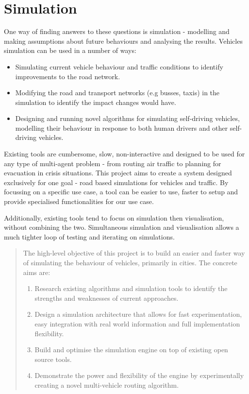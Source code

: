 \documentclass[ draft,
                    author={Alexander Hill},
                supervisor={Dr. Benjamin Sach},
                    degree={MEng},
                     title={MARMOSET: Multi Agent Real-time Multi-core Online
                     Simulation for Efficient Transportation},
                  subtitle={},
                      type={research},
                      year={2016} ]{dissertation}
\begin{document}
\section{Simulation}

One way of finding answers to these questions is simulation - modelling and
making assumptions about future behaviours and analysing the results. Vehicles
simulation can be used in a number of ways:

\begin{itemize}
    \item Simulating current vehicle behaviour and traffic conditions to
        identify improvements to the road network.
    \item Modifying the road and transport networks (e.g busses, taxis) in the
        simulation to identify the impact changes would have.
    \item Designing and running novel algorithms for simulating self-driving
        vehicles, modelling their behaviour in response to both human drivers
        and other self-driving vehicles.
\end{itemize}

Existing tools are cumbersome, slow, non-interactive and designed to be used
for any type of multi-agent problem - from routing air traffic to planning for
evacuation in crisis situations. This project aims to create a system designed
exclusively for one goal - road based simulations for vehicles and traffic.
By focussing on a specific use case, a tool can be easier to use, faster to
setup and provide specialised functionalities for our use case.

Additionally, existing tools tend to focus on simulation then visualisation,
without combining the two. Simultaneous simulation and visualisation allows a
much tighter loop of testing and iterating on simulations.

\begin{quote}
\noindent
The high-level objective of this project is to build an easier and faster way of
simulating the behaviour of vehicles, primarily in cities. The concrete aims
are:

\begin{enumerate}
    \item Research existing algorithms and simulation tools to identify the
            strengths and weaknesses of current approaches.
    \item Design a simulation architecture that allows for fast experimentation,
        easy integration with real world information and full implementation
        flexibility.
    \item Build and optimise the simulation engine on top of existing open
        source tools.
    \item Demonstrate the power and flexibility of the engine by experimentally
        creating a novel multi-vehicle routing algorithm.
\end{enumerate}

\end{quote}
\end{document}
